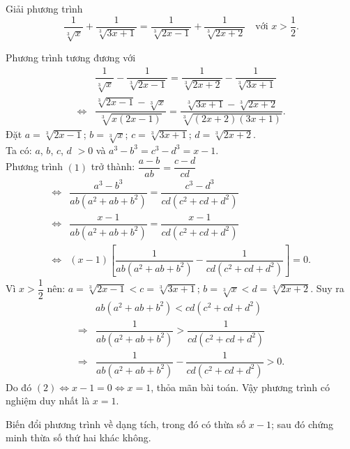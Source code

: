 \begin{bt}%
Giải phương trình
$$\dfrac{1}{\sqrt[3]{x}} + \dfrac{1}{\sqrt[3]{3x+1}} = \dfrac{1}{\sqrt[3]{2x-1}} + \dfrac{1}{\sqrt[3]{2x+2}} \quad \text{với } x > \dfrac{1}{2}.$$
\loigiai
{Phương trình tương đương với
{\allowdisplaybreaks
\begin{align*}
 & \dfrac{1}{\sqrt[3]{x}} - \dfrac{1}{\sqrt[3]{2x-1}} = \dfrac{1}{\sqrt[3]{2x+2}} - \dfrac{1}{\sqrt[3]{3x+1}}\\
 \Leftrightarrow & \dfrac{\sqrt[3]{2x-1} - \sqrt[3]{x}}{\sqrt[3]{x(2x-1)}} = \dfrac{\sqrt[3]{3x+1} - \sqrt[3]{2x+2}}{\sqrt[3]{(2x+2)(3x+1)}}. \tag{1}
\end{align*}}
Đặt $a = \sqrt[3]{2x-1}$; $b = \sqrt[3]{x}$; $c = \sqrt[3]{3x+1}$; $d = \sqrt[3]{2x+2}$.\\
Ta có: $a$, $b$, $c$, $d$ $>0$ và $a^3 - b^3 = c^3 - d^3 = x - 1$.\\
Phương trình $(1)$ trở thành: $\dfrac{a-b}{ab} = \dfrac{c-d}{cd}$
{\allowdisplaybreaks
\begin{align*}
 \Leftrightarrow & \dfrac{a^3-b^3}{ab(a^2+ab+b^2)} = \dfrac{c^3-d^3}{cd(c^2+cd+d^2)}\\
 \Leftrightarrow & \dfrac{x-1}{ab(a^2+ab+b^2)} = \dfrac{x-1}{cd(c^2+cd+d^2)}\\
 \Leftrightarrow & (x-1) \left[ \dfrac{1}{ab(a^2+ab+b^2)} - \dfrac{1}{cd(c^2+cd+d^2)} \right] = 0. \tag{2}
\end{align*}}
Vì $x> \dfrac{1}{2}$ nên: $a = \sqrt[3]{2x-1} < c = \sqrt[3]{3x+1}$; $b = \sqrt[3]{x} < d = \sqrt[3]{2x+2}$. Suy ra
{\allowdisplaybreaks
\begin{align*}
 & ab(a^2 + ab + b^2) < cd(c^2 + cd + d^2)\\
 \Rightarrow & \dfrac{1}{ab(a^2+ab+b^2)} > \dfrac{1}{cd(c^2+cd+d^2)}\\
 \Rightarrow & \dfrac{1}{ab(a^2+ab+b^2)} - \dfrac{1}{cd(c^2+cd+d^2)} > 0.
\end{align*}}
Do đó $(2) \Leftrightarrow x-1=0 \Leftrightarrow x=1$, thỏa mãn bài toán. Vậy phương trình có nghiệm duy nhất là $x=1$.
\begin{nx}
Biến đổi phương trình về dạng tích, trong đó có thừa số $x-1$; sau đó chứng minh thừa số thứ hai khác không.
\end{nx}
}
\end{bt}

